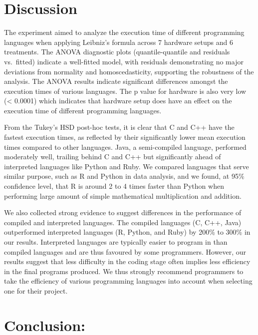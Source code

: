 \documentclass[12pt,halfline,a4paper,]{ouparticle}
\begin{document}
\section{Discussion}\label{discussion}

The experiment aimed to analyze the execution time of different
programming languages when applying Leibniz's formula across 7 hardware
setups and 6 treatments. The ANOVA diagnostic plots (quantile-quantile
and residuals vs.~fitted) indicate a well-fitted model, with residuals
demonstrating no major deviations from normality and homoscedasticity,
supporting the robustness of the analysis. The ANOVA results indicate
significant differences amongst the execution times of various
languages. The p value for hardware is also very low (\textless{}
0.0001) which indicates that hardware setup does have an effect on the
execution time of different programming languages.

From the Tukey's HSD post-hoc tests, it is clear that C and C++ have the
fastest execution times, as reflected by their significantly lower mean
execution times compared to other languages. Java, a semi-compiled
language, performed moderately well, trailing behind C and C++ but
significantly ahead of interpreted languages like Python and Ruby. We
compared languages that serve similar purpose, such as R and Python in
data analysis, and we found, at 95\% confidence level, that R is around
2 to 4 times faster than Python when performing large amount of simple
mathematical multiplication and addition.

We also collected strong evidence to suggest differences in the
performance of compiled and interpreted languages. The compiled
languages (C, C++, Java) outperformed interpreted languages (R, Python,
and Ruby) by 200\% to 300\% in our results. Interpreted languages are
typically easier to program in than compiled languages and are thus
favoured by some programmers. However, our results suggest that less
difficulty in the coding stage often implies less efficiency in the
final programs produced. We thus strongly recommend programmers to take
the efficiency of various programming languages into account when
selecting one for their project.

\section{Conclusion:}\label{conclusion}
\end{document}
